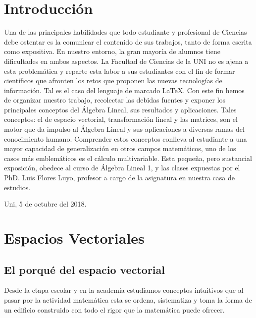 \documentclass[b5paper, 11pt]{book}
\newcommand{\0}{\mathbf{0}}
\theoremstyle{estiloB}
\theoremstyle{estiloC}
\theoremstyle{estiloD}
\theoremstyle{estiloE}
\begin{document}
\tableofcontents
\chapter*{Introducción}
Una de las principales habilidades que todo estudiante y profesional de Ciencias debe ostentar es la comunicar el contenido de sus trabajos, tanto de forma escrita como expositiva. En nuestro entorno, la gran mayoría de alumnos tiene dificultades en ambos aspectos. La Facultad de Ciencias de la UNI no es ajena a esta problemática y reparte esta labor a sus estudiantes con el fin de formar científicos que afronten los retos que proponen las nuevas tecnologías de información. Tal es el caso del lenguaje de marcado \LaTeX. Con este fin hemos de organizar nuestro trabajo, recolectar las debidas fuentes y exponer los principales conceptos del Álgebra Lineal, sus resultados y aplicaciones. Tales conceptos: el de espacio vectorial, transformación lineal y las matrices, son el motor que da impulso al Álgebra Lineal y sus aplicaciones a diversas ramas del conocimiento humano. Comprender estos conceptos conlleva al estudiante a una mayor capacidad de generalización en otros campos matemáticos, uno de los casos más emblemáticos es el cálculo multivariable. Esta pequeña, pero sustancial exposición, obedece al curso de Álgebra Lineal 1, y las clases expuestas por el PhD. Luis Flores Luyo, profesor a cargo de la asignatura en nuestra casa de estudios.

\hfill Uni, 5 de octubre del 2018.

\chapter{Espacios Vectoriales}
\section{El porqué del espacio vectorial}
Desde la etapa escolar y en la academia estudiamos conceptos intuitivos que al pasar por la actividad matemática esta se ordena, sistematiza y toma la forma de un edificio construido con todo el rigor que la matemática puede ofrecer.
\end{document}
